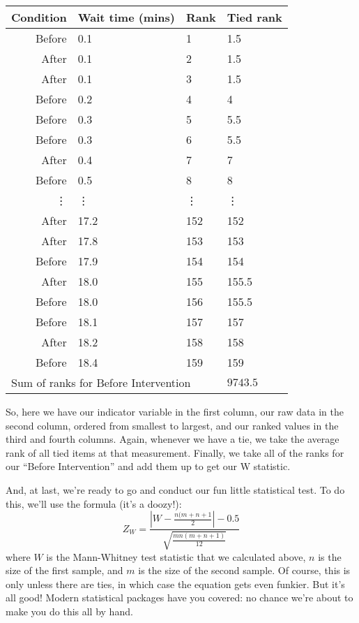 \begin{tabular}{r | l l l}
Condition & Wait time (mins) & Rank & Tied rank \\
\hline
Before & 0.1 & 1 & 1.5 \\
After & 0.1 & 2 & 1.5 \\
After & 0.1 & 3 & 1.5 \\
Before & 0.2 & 4 & 4 \\
Before & 0.3 & 5 & 5.5 \\
Before & 0.3 & 6 & 5.5 \\
After & 0.4 & 7 & 7 \\
Before & 0.5 & 8  & 8 \\
\vdots & \vdots & \vdots & \vdots \\
After & 17.2 & 152 & 152 \\
After & 17.8 & 153 & 153 \\
Before & 17.9 & 154 & 154 \\
After & 18.0 & 155 & 155.5 \\
Before & 18.0 & 156 & 155.5 \\
Before & 18.1 & 157 & 157 \\
After & 18.2 & 158 & 158 \\
Before & 18.4 & 159 & 159 \\
\hline
\multicolumn{3}{l}{Sum of ranks for Before Intervention} & $9743.5$ \\
\end{tabular}

So, here we have our indicator variable in the first column, our raw data in the second column, ordered from smallest to largest, and our ranked values in the third and fourth columns. Again, whenever we have a tie, we take the average rank of all tied items at that measurement. Finally, we take all of the ranks for our ``Before Intervention'' and add them up to get our W statistic.

And, at last, we're ready to go and conduct our fun little statistical test. To do this, we'll use the formula (it's a doozy!):
\begin{equation}
Z_W = \frac{\left|W-\frac{n(m+n+1}{2}\right|-0.5}{\sqrt{\frac{mn(m+n+1)}{12}}}
\end{equation}
where $W$ is the Mann-Whitney test statistic that we calculated above, $n$ is the size of the first sample, and $m$ is the size of the second sample. Of course, this is only unless there are ties, in which case the equation gets even funkier. But it's all good! Modern statistical packages have you covered: no chance we're about to make you do this all by hand.

